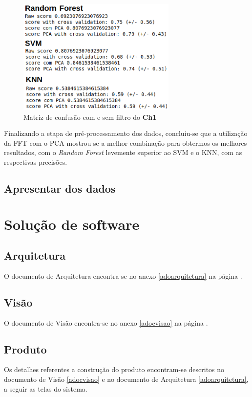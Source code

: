 \begin{figure}[!htb]
    \centering
    \includegraphics[width=0.7\textwidth]{figuras/modeloComp.eps}
    \caption{Matriz de confusão com e sem filtro do \textbf{Ch1}}
    \label{pcavalidator}
\end{figure}

Finalizando a etapa de pré-processamento dos dados, concluiu-se que a utilização da FFT com o PCA mostrou-se a melhor combinação para obtermos os melhores resultados, com o \textit{Random Forest} levemente superior ao SVM e o KNN, com as respectivas precisões.

\subsection{Apresentar dos dados}

\section{Solução de software}
\subsection{Arquitetura}
O documento de Arquitetura encontra-se no anexo \ref{adoarquitetura} na página \pageref{adoarquitetura}.

\subsection{Visão}
O documento de Visão encontra-se no anexo \ref{adocvisao} na página \pageref{adocvisao}.

\subsection{Produto}
Os detalhes referentes a construção do produto encontram-se descritos no documento de Visão \ref{adocvisao} e no documento de Arquitetura \ref{adoarquitetura}, a seguir as telas do sistema.


